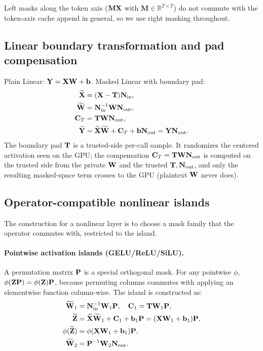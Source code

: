 Left masks along the token axis ($\mathbf{M}\mathbf{X}$ with $\mathbf{M} \in \mathbb{R}^{T \times T}$) do not commute with the token-axis cache append in general, so we use right masking throughout.



\subsection{Linear boundary transformation and pad compensation}
\label{sec:design:linear}
Plain Linear: $\mathbf{Y} = \mathbf{X}\mathbf{W} + \mathbf{b}$. Masked Linear with boundary pad:
\begin{align}
\widetilde{\mathbf{X}} &= (\mathbf{X} - \mathbf{T})\mathbf{N}_{\mathrm{in}}, \\
\widetilde{\mathbf{W}} &= \mathbf{N}_{\mathrm{in}}^{-1}\mathbf{W}\mathbf{N}_{\mathrm{out}}, \\
\mathbf{C}_{T} &= \mathbf{T}\mathbf{W}\mathbf{N}_{\mathrm{out}}, \\
\widetilde{\mathbf{Y}} &= \widetilde{\mathbf{X}}\widetilde{\mathbf{W}} + \mathbf{C}_{T} + \mathbf{b}\mathbf{N}_{\mathrm{out}} = \mathbf{Y}\mathbf{N}_{\mathrm{out}}.
\end{align}
The boundary pad $\mathbf{T}$ is a trusted-side per-call sample. It randomizes the centered activation seen on the GPU; the compensation $\mathbf{C}_{T} = \mathbf{T}\mathbf{W}\mathbf{N}_{\mathrm{out}}$ is computed on the trusted side from the private $\mathbf{W}$ and the trusted $\mathbf{T}, \mathbf{N}_{\mathrm{out}}$, and only the resulting masked-space term crosses to the GPU (plaintext $\mathbf{W}$ never does).



\subsection{Operator-compatible nonlinear islands}
\label{sec:design:islands}
The construction for a nonlinear layer is to choose a mask family that the operator commutes with, restricted to the island.

\paragraph{Pointwise activation islands (GELU/ReLU/SiLU).} A permutation matrix $\mathbf{P}$ is a special orthogonal mask. For any pointwise $\phi$, $\phi(\mathbf{Z}\mathbf{P}) = \phi(\mathbf{Z})\mathbf{P}$, because permuting columns commutes with applying an elementwise function column-wise. The island is constructed as:
\begin{align}
\widetilde{\mathbf{W}}_1 &= \mathbf{N}_{\mathrm{in}}^{-1}\mathbf{W}_1\mathbf{P}, \quad \mathbf{C}_{1} = \mathbf{T}\mathbf{W}_1\mathbf{P}, \\
\widetilde{\mathbf{Z}} &= \widetilde{\mathbf{X}}\widetilde{\mathbf{W}}_1 + \mathbf{C}_{1} + \mathbf{b}_1\mathbf{P} = (\mathbf{X}\mathbf{W}_1 + \mathbf{b}_1)\mathbf{P}, \\
\phi(\widetilde{\mathbf{Z}}) &= \phi(\mathbf{X}\mathbf{W}_1 + \mathbf{b}_1)\mathbf{P}, \\
\widetilde{\mathbf{W}}_2 &= \mathbf{P}^{-1}\mathbf{W}_2\mathbf{N}_{\mathrm{out}}.
\end{align}

